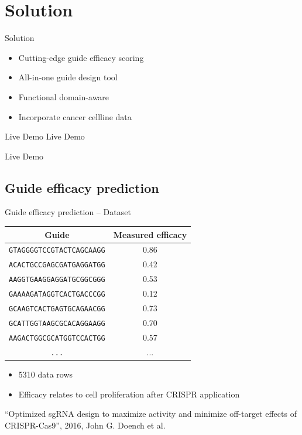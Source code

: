 \documentclass[Nike]{tuberlinbeamer}
\begin{document}
\section{Solution}

\begin{frame}{Solution}
  \begin{itemize}
    \item Cutting-edge guide efficacy scoring
    \item All-in-one guide design tool
    \item Functional domain-aware
    \item Incorporate cancer cellline data
  \end{itemize}
\end{frame}

\begin{frame}{Live Demo}
  Live Demo
\end{frame}{Live Demo}

\subsection{Guide efficacy prediction}

\begin{frame}{Guide efficacy prediction -- Dataset}
\begin{table}[]
    \centering
    \begin{tabular}{cc}
        \textbf{Guide} & \textbf{Measured efficacy} \\ \hline
\texttt{GTAGGGGTCCGTACTCAGCAAGG} & 0.86 \\
\texttt{ACACTGCCGAGCGATGAGGATGG} & 0.42 \\
\texttt{AAGGTGAAGGAGGATGCGGCGGG} & 0.53 \\
\texttt{GAAAAGATAGGTCACTGACCCGG} & 0.12 \\
\texttt{GCAAGTCACTGAGTGCAGAACGG} & 0.73 \\
\texttt{GCATTGGTAAGCGCACAGGAAGG} & 0.70 \\
\texttt{AAGACTGGCGCATGGTCCACTGG} & 0.57 \\
\texttt{...} & ... \\
    \end{tabular}
\end{table}
\begin{itemize}
  \item 5310 data rows
  \item Efficacy relates to cell proliferation after CRISPR application
\end{itemize}
\begin{flushright}
  \tiny
  ``Optimized sgRNA design to maximize activity and minimize off-target effects of CRISPR-Cas9'', 2016, John G. Doench et al.\
\end{flushright}
\end{frame}
\end{document}
